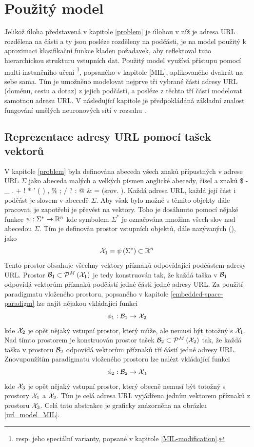 \chapter{Použitý model}\label{model}

Jelikož úloha představená v kapitole \ref{problem} je úlohou v níž je adresa URL rozdělena na části a ty jsou posléze rozděleny na podčásti, je na model použitý k aproximaci klasifikační funkce kladen požadavek, aby reflektoval tuto hierarchickou strukturu vstupních dat. Použitý model využívá přístupu pomocí multi-instančního učení \footnote{resp. jeho speciální varianty, popsané v kapitole \ref{MIL-modification}.}, popsaného v kapitole \ref{MIL}, aplikovaného dvakrát na sebe sama. Tím je umožněno modelovat nejprve tři vybrané části adresy URL (doménu, cestu a dotaz) z jejich podčástí, a posléze z těchto tří částí modelovat samotnou adresu URL. V následující kapitole je předpokládáná základní znalost fungování umělých neuronových sítí v rozsahu \cite{goodfellow_deep_2016}.

\section{Reprezentace adresy URL pomocí tašek vektorů}\label{URL_MIL_representation}

V kapitole \ref{problem} byla definována abeceda všech znaků přípustných v adrese URL \( \Sigma \) jako abeceda malých a velkých písmen anglické abecedy, čísel a znaků \$ - \_ . + ! * ' ( ) , \% ; / ? : @ \& = (srov. \cite{berners-lee_uniform_1994}). Každá adresa URL, každá její část i podčást je slovem v abecedě \( \Sigma \). Aby však bylo možné s těmito objekty dále pracovat, je zapotřebí je převést na vektory. Toho je dosáhnuto pomocí nějaké funkce \( \psi : \Sigma^* \to \mathbb R^n \) kde symbolem \( \Sigma^* \) je označována množina všech slov nad abecedou \( \Sigma \). Tím je definován prostor vstupních objektů, dále nazývaných  (), jako
\[ \mathcal X_1 = \psi \left( \Sigma^* \right) \subset \mathbb R^n \]
Tento prostor obsahuje všechny vektory příznaků odpovídající podčástem adresy URL. Prostor \( \mathcal B_1 \subset \mathcal P^M \left( \mathcal X_1 \right) \) je tedy konstruován tak, že každá taška v \( \mathcal B_1 \) odpovídá vektorům příznaků podčástí jedné části jedné adresy URL. Za použití paradigmatu vloženého prostoru, popsaného v kapitole \ref{embedded-space-paradigm} lze najít nějakou vkládající funkci
\[ \phi_1 : \mathcal B_1 \to \mathcal X_2 \]
kde \( \mathcal X_2 \) je opět nějaký vstupní prostor, který může, ale nemusí být totožný s \( \mathcal X_1 \). Nad tímto prostorem je konstruován prostor tašek \( \mathcal B_2 \subset \mathcal P^M \left( \mathcal X_2 \right) \) tak, že každá taška v prostoru \( \mathcal B_2 \) odpovídá vektorům příznaků tří částí jedné adresy URL. Znovupoužítím paradigmatu vloženého prostoru lze nalézt vkládající funkci
\[ \phi_2 : \mathcal B_2 \to \mathcal X_3 \]
kde \( \mathcal X_3 \) je opět nějaký vstupní prostor, který obecně nemusí být totožný s prostory \( \mathcal X_1 \) a \( \mathcal X_2 \). Tím je celá adresa URL vyjádřena jedním vektorem příznaků z prostoru \( \mathcal X_3 \). Celá tato abstrakce je graficky znázorněna na obrázku \ref{url_model_MIL}.

